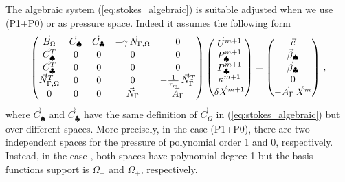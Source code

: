 The algebraic system (\ref{eq:stokes_algebraic}) is suitable adjusted when we
use (P1+P0) or \pdg as pressure space. Indeed it assumes the following form
\begin{equation}
\begin{pmatrix}
\vec B_\Omega & \vec C_{\spadesuit} & \vec C_{\clubsuit} & -\gamma\,\vec{N}_{\Gamma,\Omega} & 0\\
\vec C^T_{\spadesuit} & 0 & 0 & 0 & 0 \\
\vec C^T_{\clubsuit} & 0 & 0 & 0 & 0 \\
\vec{N}_{\Gamma,\Omega}^T & 0 & 0 & 0 & -\frac1{\tau_m}\,\vec N_\Gamma^T \\
0 & 0 & 0 & \vec N_\Gamma & \vec A_\Gamma
\end{pmatrix}
\begin{pmatrix}
\vec U^{m+1} \\
P^{m+1}_\spadesuit \\
P^{m+1}_\clubsuit \\
\kappa^{m+1} \\
\delta\vec X^{m+1}
\end{pmatrix}
=
\begin{pmatrix}
\vec c \\
\vec \beta_\spadesuit \\
\vec \beta_\clubsuit \\
0 \\
-\vec A_\Gamma\,\vec X^m
\end{pmatrix} \,,
\label{eq:stokes_algebraic_extended}
\end{equation}
where $\vec C_{\spadesuit}$ and $\vec C_{\clubsuit}$ have the same definition
of $\vec C_\Omega$ in (\ref{eq:stokes_algebraic}) but over different spaces.
More precisely, in the case (P1+P0), there are two independent spaces for the
pressure of polynomial order 1 and 0, respectively. Instead, in the case \pdg,
both spaces have polynomial degree 1 but the basis functions support is
$\Omega_-$ and $\Omega_+$, respectively.

